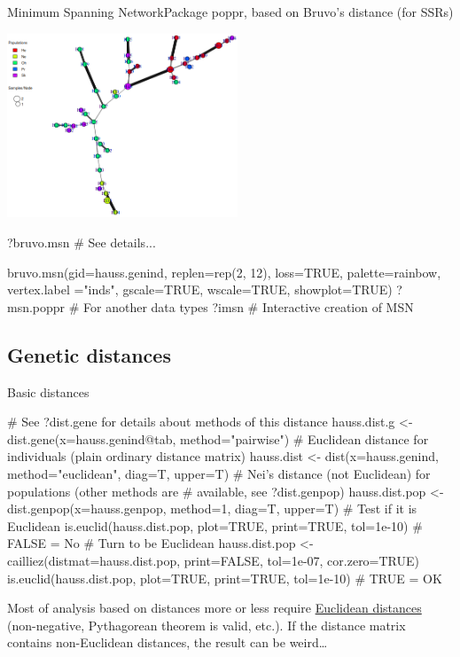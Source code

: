 \documentclass[compress, ucs, xelatex, 11pt, xcolor=svgnames, aspectratio=169,
	hyperref={
		bookmarks=true,
		unicode=true,
		colorlinks=true,
		pdftitle={Molecular data in R},
		plainpages=false,
		pdfauthor={Vojtech Zeisek},
		pdfsubject={Course about phylogeny and evolution in R},
		pdfcreator={XeLaTeX},
		pdfkeywords={R, evolution, phylogeny, molecular data},
		linkcolor=Crimson, %
		anchorcolor=Magenta, %
		citecolor=Magenta, %
		filecolor=Magenta, %
		menucolor=Magenta, %
		urlcolor=DodgerBlue, %
		pdftex},
	url={hyphens, lowtilde} %
	]{beamer}
\renewcommand{\texttt}[1]{\colorbox{Beige}{{\ttfamily #1}}}
\begin{document}
\begin{frame}[fragile]{Minimum Spanning Network}{Package poppr, based on Bruvo's distance (for SSRs)}
	\label{MSN}
	\begin{multicols}{2}
		\begin{center}
			\includegraphics[height=5.5cm]{msn.png}
		\end{center}
		\begin{spluscode}
    ?bruvo.msn # See details...
		\end{spluscode}
		\columnbreak
		\begin{spluscode}
    bruvo.msn(gid=hauss.genind,
      replen=rep(2, 12), loss=TRUE,
      palette=rainbow, vertex.label
      ="inds", gscale=TRUE,
      wscale=TRUE, showplot=TRUE)
    ?msn.poppr # For another data types
    ?imsn # Interactive creation of MSN
		\end{spluscode}
		\begin{center}
			\texttt{[image: msn-bruvo\_no\_labels.png]}
		\end{center}
	\end{multicols}
\end{frame}

\subsection{Genetic distances}

\begin{frame}[fragile]{Basic distances}
	\label{distances}
	\begin{spluscode}
    # See ?dist.gene for details about methods of this distance
    hauss.dist.g <- dist.gene(x=hauss.genind@tab, method="pairwise")
    # Euclidean distance for individuals (plain ordinary distance matrix)
    hauss.dist <- dist(x=hauss.genind, method="euclidean", diag=T, upper=T)
    # Nei's distance (not Euclidean) for populations (other methods are
    # available, see ?dist.genpop)
    hauss.dist.pop <- dist.genpop(x=hauss.genpop, method=1, diag=T, upper=T)
    # Test if it is Euclidean
    is.euclid(hauss.dist.pop, plot=TRUE, print=TRUE, tol=1e-10) # FALSE = No
    # Turn to be Euclidean
    hauss.dist.pop <- cailliez(distmat=hauss.dist.pop, print=FALSE, tol=1e-07,
      cor.zero=TRUE)
    is.euclid(hauss.dist.pop, plot=TRUE, print=TRUE, tol=1e-10) # TRUE = OK
	\end{spluscode}
	\vfil
	Most of analysis based on distances more or less require \href{https://en.wikipedia.org/wiki/Euclidean_distance_matrix}{Euclidean distances} (non-negative, Pythagorean theorem is valid, etc.). If the distance matrix contains non-Euclidean distances, the result can be weird\ldots
	\vfill
\end{frame}
\end{document}
